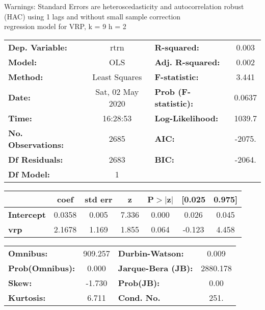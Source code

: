 Warnings: \newline
 [1] Standard Errors are heteroscedasticity and autocorrelation robust (HAC) using 1 lags and without small sample correction\\ 

regression model for VRP, k = 9 h = 2\begin{center}
\begin{tabular}{lclc}
\toprule
\textbf{Dep. Variable:}    &       rtrn       & \textbf{  R-squared:         } &     0.003   \\
\textbf{Model:}            &       OLS        & \textbf{  Adj. R-squared:    } &     0.002   \\
\textbf{Method:}           &  Least Squares   & \textbf{  F-statistic:       } &     3.441   \\
\textbf{Date:}             & Sat, 02 May 2020 & \textbf{  Prob (F-statistic):} &   0.0637    \\
\textbf{Time:}             &     16:28:53     & \textbf{  Log-Likelihood:    } &    1039.7   \\
\textbf{No. Observations:} &        2685      & \textbf{  AIC:               } &    -2075.   \\
\textbf{Df Residuals:}     &        2683      & \textbf{  BIC:               } &    -2064.   \\
\textbf{Df Model:}         &           1      & \textbf{                     } &             \\
\bottomrule
\end{tabular}
\begin{tabular}{lcccccc}
                   & \textbf{coef} & \textbf{std err} & \textbf{z} & \textbf{P$> |$z$|$} & \textbf{[0.025} & \textbf{0.975]}  \\
\midrule
\textbf{Intercept} &       0.0358  &        0.005     &     7.336  &         0.000        &        0.026    &        0.045     \\
\textbf{vrp}       &       2.1678  &        1.169     &     1.855  &         0.064        &       -0.123    &        4.458     \\
\bottomrule
\end{tabular}
\begin{tabular}{lclc}
\textbf{Omnibus:}       & 909.257 & \textbf{  Durbin-Watson:     } &    0.009  \\
\textbf{Prob(Omnibus):} &   0.000 & \textbf{  Jarque-Bera (JB):  } & 2880.178  \\
\textbf{Skew:}          &  -1.730 & \textbf{  Prob(JB):          } &     0.00  \\
\textbf{Kurtosis:}      &   6.711 & \textbf{  Cond. No.          } &     251.  \\
\bottomrule
\end{tabular}
\end{center}


